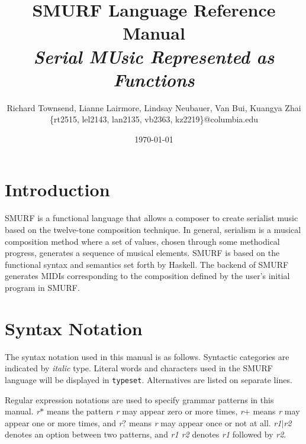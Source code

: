 \documentclass[dvips, 12pt]{article}
\title{{\Huge \bfseries SMURF Language Reference Manual} \\ \Large \it Serial MUsic Represented as Functions \vspace{0.6cm}}
\author{\normalsize Richard Townsend, Lianne Lairmore, Lindsay Neubauer, Van Bui, Kuangya Zhai
	\\ \small \{rt2515, lel2143, lan2135, vb2363, kz2219\}@columbia.edu \vspace{0.6cm}}
\date{\today \vspace{2cm}}
\begin{document}
\maketitle
\clearpage


\tableofcontents

\section{Introduction}
SMURF is a functional language that allows a composer to create serialist music
based on the twelve-tone composition technique. In general, serialism is a musical composition
method where a set of values, chosen through some methodical progress,
generates a sequence of musical elements. SMURF is based on the
functional syntax and semantics set forth by Haskell. The backend of
SMURF generates MIDIs corresponding to the composition defined by the 
user's initial program in SMURF. 

\section{Syntax Notation}
The syntax notation used in this manual is as follows. Syntactic 
categories are indicated by \emph{italic} type. Literal words and 
characters used in the SMURF language will be displayed in \texttt{typeset}. 
Alternatives are listed on separate lines. 

Regular expression notations are used to specify grammar patterns in this
manual.  {\it r}$*$ means the pattern {\it r} may appear zero or more times,
{\it r}$+$ means {\it r} may appear one or more times, and {\it r}$?$
means {\it r} may appear once or not at all. {\it r1}$|${\it r2} denotes an option
between two patterns, and {\it r1 r2} denotes {\it r1} followed by
{\it r2}. 







\clearpage
\end{document}
